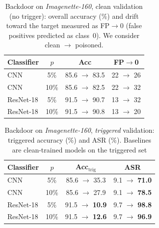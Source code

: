 \documentclass{article}
\begin{document}
\begin{table}[H]
  \caption{Backdoor on \textit{Imagenette-160}, clean validation (no trigger): overall accuracy (\%) and drift toward the target measured as FP$\to$0 (false positives predicted as class~0). We consider clean $\rightarrow$ poisoned.}
  \label{tab:backdoor-clean}
  \centering
  \begin{small}
    \begin{tabular}{lccc}
      \toprule
      Classifier & $p$ & Acc & FP$\to$0 \\
      \midrule
      CNN        & 5\%  & 85.6 $\rightarrow$ 83.5 & 22 $\rightarrow$ 26 \\
      CNN        & 10\% & 85.6 $\rightarrow$ 82.5 & 22 $\rightarrow$ 32 \\
      ResNet-18\footnotemark[6] & 5\%  & 91.5 $\rightarrow$ 90.7 & 13 $\rightarrow$ 32 \\
      ResNet-18\footnotemark[6] & 10\% & 91.5 $\rightarrow$ 90.8 & 13 $\rightarrow$ 20 \\
      \bottomrule
    \end{tabular}
  \end{small}
  \vspace{-0.35cm}
\end{table}

\begin{table}[H]
  \caption{Backdoor on \textit{Imagenette-160}, \emph{triggered} validation: 
  triggered accuracy (\%) and ASR (\%). Baselines are clean-trained models 
  on the triggered set}
  \label{tab:backdoor-triggered}
  \centering
  \begin{small}
    \begin{tabular}{lccc}
      \toprule
      Classifier & $p$  & Acc$_\text{trig}$ & ASR \\
      \midrule
      CNN        & 5\%  & 85.6 $\rightarrow$ 35.3 & 9.1 $\rightarrow$ \textbf{71.0} \\
      CNN        & 10\% & 85.6 $\rightarrow$ 27.9 & 9.1 $\rightarrow$ \textbf{78.5} \\
      ResNet-18  & 5\%  & 91.5 $\rightarrow$ \textbf{10.9} & 9.7 $\rightarrow$ \textbf{98.8} \\
      ResNet-18  & 10\% & 91.5 $\rightarrow$ \textbf{12.6} & 9.7 $\rightarrow$ \textbf{96.9} \\
      \bottomrule
    \end{tabular}
  \end{small}
  \vspace{-0.35cm}
\end{table}
\end{document}
